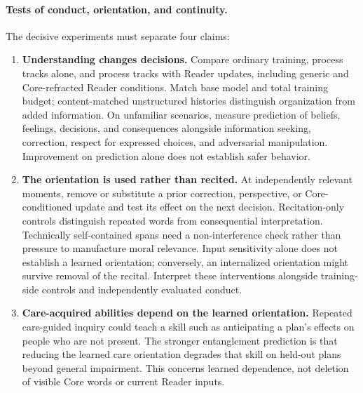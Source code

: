 \documentclass[10pt]{article}
\begin{document}
\paragraph{Tests of conduct, orientation, and continuity.}
The decisive experiments must separate four claims:
\begin{enumerate}
  \item \textbf{Understanding changes decisions.} Compare ordinary training,
    process tracks alone, and process tracks with Reader updates, including
    generic and Core-refracted Reader conditions. Match base model and total
    training budget; content-matched unstructured histories distinguish
    organization from added information. On unfamiliar scenarios, measure
    prediction of beliefs, feelings, decisions, and consequences alongside
    information seeking, correction, respect for expressed choices, and
    adversarial manipulation. Improvement on prediction alone does not
    establish safer behavior.
  \item \textbf{The orientation is used rather than recited.} At independently
    relevant moments, remove or substitute a prior correction, perspective,
    or Core-conditioned update and test its effect on the next decision.
    Recitation-only controls distinguish repeated words from consequential
    interpretation. Technically self-contained spans need a non-interference
    check rather than pressure to manufacture moral relevance. Input
    sensitivity alone does not establish a learned orientation; conversely,
    an internalized orientation might survive removal of the recital. Interpret
    these interventions alongside training-side controls and independently
    evaluated conduct.
  \item \textbf{Care-acquired abilities depend on the learned orientation.}
    Repeated care-guided inquiry could teach a skill such as anticipating a
    plan's effects on people who are not present. The stronger entanglement
    prediction is that reducing the learned care orientation degrades that
    skill on held-out plans beyond general impairment. This concerns learned dependence, not
    deletion of visible Core words or current Reader inputs.


\end{enumerate}
\end{document}
